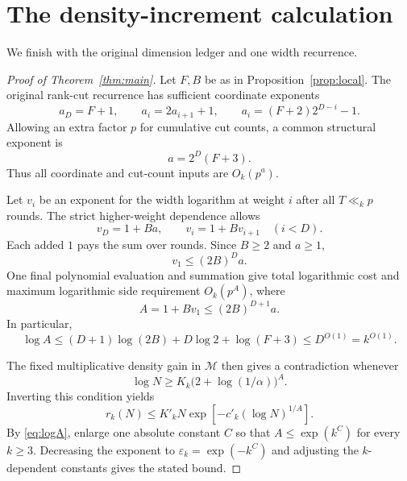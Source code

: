 \documentclass[11pt,a4paper]{article}
\theoremstyle{definition}
\newcommand{\M}{\mathcal M}
\begin{document}
\section{The density-increment calculation}

We finish with the original dimension ledger and one
width recurrence.

\begin{proof}[Proof of Theorem~\ref{thm:main}]
Let \(F,B\) be as in Proposition~\ref{prop:local}.
The original rank-cut recurrence has sufficient
coordinate exponents
\[
 a_D=F+1,\qquad a_i=2a_{i+1}+1,
 \qquad
 a_i=(F+2)2^{D-i}-1.
\]
Allowing an extra factor \(p\) for cumulative cut
counts, a common structural exponent is
\[
 a=2^D(F+3).
\]
Thus all coordinate and cut-count inputs are
\(O_k(p^a)\).

Let \(v_i\) be an exponent for the width logarithm
at weight \(i\) after all \(T\ll_k p\) rounds.
The strict higher-weight dependence allows
\[
 v_D=1+Ba,\qquad v_i=1+Bv_{i+1}\quad(i<D).
\]
Each added \(1\) pays the sum over rounds.
Since \(B\ge2\) and \(a\ge1\),
\[
 v_1\le(2B)^Da.
\]
One final polynomial evaluation and summation
give total logarithmic cost and maximum
logarithmic side requirement \(O_k(p^A)\), where
\[
 A=1+Bv_1\le(2B)^{D+1}a.
\]
In particular,
\begin{equation}\label{eq:logA}
 \log A
 \le(D+1)\log(2B)+D\log2+\log(F+3)
 \le D^{O(1)}=k^{O(1)}.
\end{equation}

The fixed multiplicative density gain in \(\M\)
then gives a contradiction whenever
\[
 \log N\ge K_k\bigl(2+\log(1/\alpha)\bigr)^A.
\]
Inverting this condition yields
\[
 r_k(N)\le K'_kN
       \exp\!\left[-c'_k(\log N)^{1/A}\right].
\]
By \eqref{eq:logA}, enlarge one absolute constant
\(C\) so that \(A\le\exp(k^C)\) for every \(k\ge3\).
Decreasing the exponent to
\(\varepsilon_k=\exp(-k^C)\) and adjusting the
\(k\)-dependent constants gives the stated bound.
\end{proof}
\end{document}
